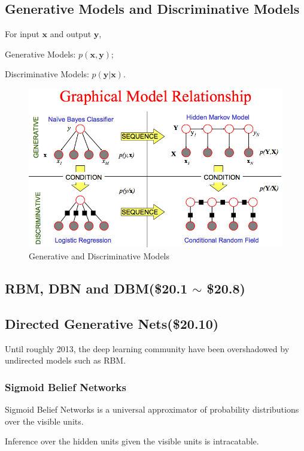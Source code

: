 \documentclass[12pt]{article}
\numberwithin{equation}{section}
\begin{document}
\subsection{Generative Models and Discriminative Models\cite{ng2002discriminative}}
	For input $\bm{x}$ and output $\bm{y}$, \par
	Generative Models: $p(\bm{x,y})$; \par
	Discriminative Models: $p(\bm{y|x})$. \par
	\par
	\begin{figure}[H]
		\includegraphics[width=\linewidth]{fig_DL/generative_discriminative_models.png}
		\caption{Generative and Discriminative Models}
		\label{fig:generative_discriminative_models}
	\end{figure}
\subsection{RBM, DBN and DBM(\$20.1 $\sim$ \$20.8)}
\subsection{Directed Generative Nets(\$20.10)}
	Until roughly 2013, the deep learning community have been overshadowed by undirected models such as RBM.
\subsubsection{Sigmoid Belief Networks}
	Sigmoid Belief Networks is a universal approximator of  probability distributions over the visible units.\par
	Inference over the hidden units given the visible units is intracatable.\par
\end{document}

